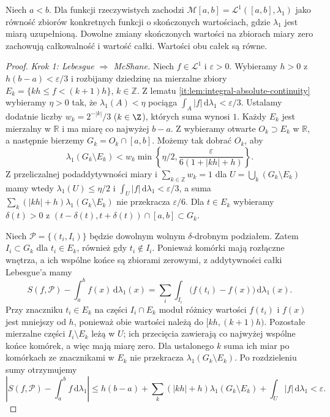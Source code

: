 \begin{twierdzenie}[McShane = Lebesgue]\label{it:thm:mcshane-lebesgue}
Niech $a<b$. Dla funkcji rzeczywistych zachodzi
$\mathcal M[a,b]=\mathcal L^1([a,b],\lambda_1)$
jako równość zbiorów konkretnych funkcji o skończonych
wartościach, gdzie $\lambda_1$ jest miarą uzupełnioną.
Dowolne zmiany skończonych wartości na zbiorach
miary zero zachowują całkowalność i wartość całki.
Wartości obu całek są równe.
\end{twierdzenie}
\begin{proof}
\emph{Krok 1: Lebesgue $\Rightarrow$ McShane.} Niech $f\in\mathcal L^1$ i $\varepsilon>0$. Wybieramy $h>0$ z $h(b-a)<\varepsilon/3$ i rozbijamy dziedzinę na mierzalne zbiory $E_k=\{kh\le f<(k+1)h\}$, $k\in\mathbb Z$. Z lematu \ref{it:lem:integral-absolute-continuity} wybieramy $\eta>0$ tak, że $\lambda_1(A)<\eta$ pociąga $\int_A|f|\,\mathrm d\lambda_1<\varepsilon/3$. Ustalamy dodatnie liczby $w_k=2^{-|k|}/3$ ($k\in\Z$), których suma wynosi $1$. Każdy $E_k$ jest mierzalny w $\mathbb R$ i ma miarę co najwyżej $b-a$. Z  wybieramy otwarte $O_k\supset E_k$ w $\mathbb R$, a następnie bierzemy $G_k=O_k\cap[a,b]$. Możemy tak dobrać $O_k$, aby
\[
 \lambda_1(G_k\setminus E_k)<
 w_k\min\left\{\eta/2,\frac{\varepsilon}{6(1+|kh|+h)}\right\}.
\]
Z przeliczalnej podaddytywności miary i $\sum_{k\in\mathbb Z}w_k=1$ dla $U=\bigcup_k(G_k\setminus E_k)$ mamy wtedy $\lambda_1(U)\le\eta/2$ i $\int_U|f|\,\mathrm d\lambda_1<\varepsilon/3$, a suma $\sum_k(|kh|+h)\lambda_1(G_k\setminus E_k)$ nie przekracza $\varepsilon/6$. Dla $t\in E_k$ wybieramy $\delta(t)>0$ z $(t-\delta(t),t+\delta(t))\cap[a,b]\subset G_k$.

Niech $\mathcal P=\{(t_i,I_i)\}$ będzie dowolnym wolnym $\delta$-drobnym podziałem. Zatem $I_i\subset G_k$ dla $t_i\in E_k$, również gdy $t_i\notin I_i$. Ponieważ komórki mają rozłączne wnętrza, a ich wspólne końce są zbiorami zerowymi, z addytywności całki Lebesgue'a mamy
\[
 S(f,\mathcal P)-\int_a^b f(x)\,\mathrm d\lambda_1(x)
 =\sum_i\int_{I_i}\bigl(f(t_i)-f(x)\bigr)\,\mathrm d\lambda_1(x).
\]
Przy znaczniku $t_i\in E_k$ na części $I_i\cap E_k$ moduł różnicy wartości $f(t_i)$ i $f(x)$ jest mniejszy od $h$, ponieważ obie wartości należą do $[kh,(k+1)h)$. Pozostałe mierzalne części $I_i\setminus E_k$ leżą w $U$; ich przecięcia zawierają co najwyżej wspólne końce komórek, a więc mają miarę zero. Dla ustalonego $k$ suma ich miar po komórkach ze znacznikami w $E_k$ nie przekracza $\lambda_1(G_k\setminus E_k)$. Po rozdzieleniu sumy otrzymujemy
\[
\left|S(f,\mathcal P)-\int_a^b f\,\mathrm d\lambda_1\right|
\le h(b-a)+\sum_k(|kh|+h)\lambda_1(G_k\setminus E_k)+\int_U|f|\,\mathrm d\lambda_1<\varepsilon.
\]


\end{proof}
